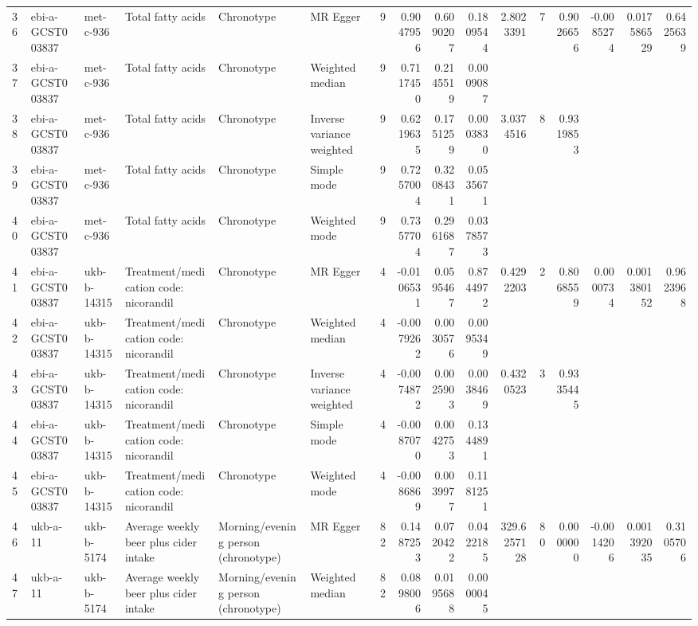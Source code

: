 \begin{longtable}{llllllrrrrrrrrrr}
  36 & ebi-a-GCST003837 & met-c-936 & Total fatty acids & Chronotype & MR Egger & 9 & 0.9047956 & 0.6090207 & 0.1809544 & 2.8023391 & 7 & 0.9026656 & -0.0085274 & 0.017586529 & 0.6425639 \\ 
  37 & ebi-a-GCST003837 & met-c-936 & Total fatty acids & Chronotype & Weighted median & 9 & 0.7117450 & 0.2145519 & 0.0009087 &  &  &  &  &  &  \\ 
  38 & ebi-a-GCST003837 & met-c-936 & Total fatty acids & Chronotype & Inverse variance weighted & 9 & 0.6219635 & 0.1751259 & 0.0003830 & 3.0374516 & 8 & 0.9319853 &  &  &  \\ 
  39 & ebi-a-GCST003837 & met-c-936 & Total fatty acids & Chronotype & Simple mode & 9 & 0.7257004 & 0.3208431 & 0.0535671 &  &  &  &  &  &  \\ 
  40 & ebi-a-GCST003837 & met-c-936 & Total fatty acids & Chronotype & Weighted mode & 9 & 0.7357704 & 0.2961687 & 0.0378573 &  &  &  &  &  &  \\ 
  41 & ebi-a-GCST003837 & ukb-b-14315 & Treatment/medication code: nicorandil & Chronotype & MR Egger & 4 & -0.0106531 & 0.0595467 & 0.8744972 & 0.4292203 & 2 & 0.8068559 & 0.0000734 & 0.001380152 & 0.9623968 \\ 
  42 & ebi-a-GCST003837 & ukb-b-14315 & Treatment/medication code: nicorandil & Chronotype & Weighted median & 4 & -0.0079262 & 0.0030576 & 0.0095349 &  &  &  &  &  &  \\ 
  43 & ebi-a-GCST003837 & ukb-b-14315 & Treatment/medication code: nicorandil & Chronotype & Inverse variance weighted & 4 & -0.0074872 & 0.0025903 & 0.0038469 & 0.4320523 & 3 & 0.9335445 &  &  &  \\ 
  44 & ebi-a-GCST003837 & ukb-b-14315 & Treatment/medication code: nicorandil & Chronotype & Simple mode & 4 & -0.0087070 & 0.0042753 & 0.1344891 &  &  &  &  &  &  \\ 
  45 & ebi-a-GCST003837 & ukb-b-14315 & Treatment/medication code: nicorandil & Chronotype & Weighted mode & 4 & -0.0086869 & 0.0039977 & 0.1181251 &  &  &  &  &  &  \\ 
  46 & ukb-a-11 & ukb-b-5174 & Average weekly beer plus cider intake & Morning/evening person (chronotype) & MR Egger & 82 & 0.1487253 & 0.0720422 & 0.0422185 & 329.6257128 & 80 & 0.0000000 & -0.0014206 & 0.001392035 & 0.3105706 \\ 
  47 & ukb-a-11 & ukb-b-5174 & Average weekly beer plus cider intake & Morning/evening person (chronotype) & Weighted median & 82 & 0.0898006 & 0.0195688 & 0.0000045 &  &  &  &  &  &  \\ 

\end{longtable}
